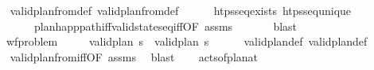 \begin{isabellebody}
%
\isadelimproof
\ \ \ \ %
\endisadelimproof
%
\isatagproof
{}\isamarkupfalse%
\ valid{\isacharunderscore}{\kern0pt}plan{\isacharunderscore}{\kern0pt}from{\isacharunderscore}{\kern0pt}def\ valid{\isacharunderscore}{\kern0pt}plan{\isacharunderscore}{\kern0pt}from{}{\isacharunderscore}{\kern0pt}def\isanewline
\ \ \ \ \isamarkupfalse%
\ htps{\isacharunderscore}{\kern0pt}seq{\isacharunderscore}{\kern0pt}exists\ htps{\isacharunderscore}{\kern0pt}seq{\isacharunderscore}{\kern0pt}unique\isanewline
\ \ \ \ \ \ \ \ \ \ plan{\isacharunderscore}{\kern0pt}happ{\isacharunderscore}{\kern0pt}path{\isacharunderscore}{\kern0pt}iff{\isacharunderscore}{\kern0pt}valid{\isacharunderscore}{\kern0pt}state{\isacharunderscore}{\kern0pt}seq{\isacharunderscore}{\kern0pt}iff{\isacharprime}{\kern0pt}{\isacharbrackleft}{\kern0pt}OF\ assms{\isacharbrackright}{\kern0pt}\ \isanewline
\ \ \ \ \isamarkupfalse%
\ blast%
\endisatagproof
{\isafoldproof}%
%
\isadelimproof
\isanewline
%
\endisadelimproof
\isanewline
\ \ \isamarkupfalse%
\ \isanewline
\ \ \ \ \ {\isachardoublequoteopen}wf{\isacharunderscore}{\kern0pt}problem{\isachardoublequoteclose}\isanewline
\ \ \ \ \ {\isachardoublequoteopen}valid{\isacharunderscore}{\kern0pt}plan{}\ {\isasympi}s\ {\isasymlongleftrightarrow}\ valid{\isacharunderscore}{\kern0pt}plan\ {\isasympi}s{\isachardoublequoteclose}\isanewline
%
\isadelimproof
\ \ \ \ %
\endisadelimproof
%
\isatagproof
{}\isamarkupfalse%
\ valid{\isacharunderscore}{\kern0pt}plan{\isacharunderscore}{\kern0pt}def\ valid{\isacharunderscore}{\kern0pt}plan{}{\isacharunderscore}{\kern0pt}def\ \isanewline
\ \ \ \ \isamarkupfalse%
\ valid{\isacharunderscore}{\kern0pt}plan{\isacharunderscore}{\kern0pt}from{}{\isacharunderscore}{\kern0pt}iff{\isacharbrackleft}{\kern0pt}OF\ assms{\isacharbrackright}{\kern0pt}\ \isamarkupfalse%
\ blast%
\endisatagproof
{\isafoldproof}%
%
\isadelimproof
\isanewline
%
\endisadelimproof
\ \ \isamarkupfalse%
\ {\isachardoublequoteopen}acts{\isacharunderscore}{\kern0pt}of{\isacharunderscore}{\kern0pt}plan{\isacharunderscore}{\kern0pt}at{\isachardoublequoteclose}\isanewline
{}\isamarkupfalse%
\ %
\isanewline
%
\isadelimtheory
\isanewline
%
\endisadelimtheory
%
\isatagtheory
{}\isamarkupfalse%
\ %
%
\endisatagtheory
{\isafoldtheory}%
%
\isadelimtheory
%
\endisadelimtheory
%
\end{isabellebody}%
